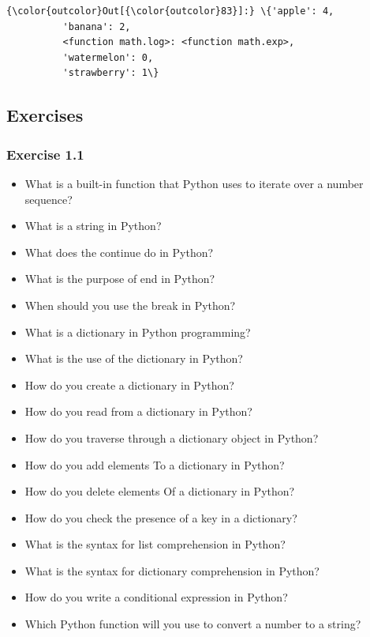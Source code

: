 \documentclass[11pt]{article}
\providecommand{\tightlist}{%
      \setlength{\itemsep}{0pt}\setlength{\parskip}{0pt}}
\begin{document}
\begin{Verbatim}[commandchars=\\\{\}]
{\color{outcolor}Out[{\color{outcolor}83}]:} \{'apple': 4,
          'banana': 2,
          <function math.log>: <function math.exp>,
          'watermelon': 0,
          'strawberry': 1\}
\end{Verbatim}
            

    \subsection{Exercises}\label{exercises}

\subsubsection{Exercise 1.1}\label{exercise-1.1}

\begin{itemize}
\tightlist
\item
  What is a built-in function that Python uses to iterate over a number
  sequence?
\item
  What is a string in Python?
\item
  What does the continue do in Python?
\item
  What is the purpose of end in Python?
\item
  When should you use the break in Python?
\item
  What is a dictionary in Python programming?
\item
  What is the use of the dictionary in Python?
\item
  How do you create a dictionary in Python?
\item
  How do you read from a dictionary in Python?
\item
  How do you traverse through a dictionary object in Python?
\item
  How do you add elements To a dictionary in Python?
\item
  How do you delete elements Of a dictionary in Python?
\item
  How do you check the presence of a key in a dictionary?
\item
  What is the syntax for list comprehension in Python?
\item
  What is the syntax for dictionary comprehension in Python?
\item
  How do you write a conditional expression in Python?
\item
  Which Python function will you use to convert a number to a string?
\end{itemize}
    
\end{document}
